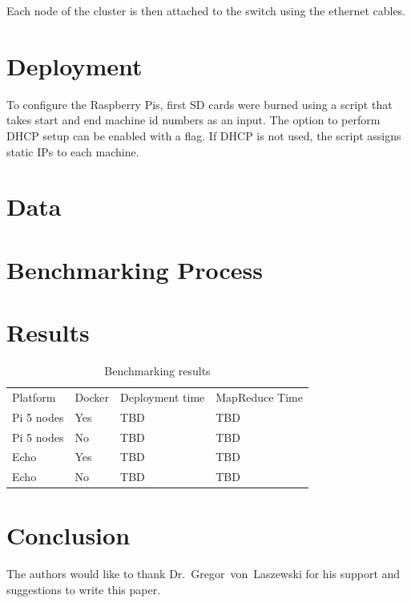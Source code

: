 Each node of the cluster is then attached to the switch using the ethernet cables. 

\section{Deployment}
To configure the Raspberry Pis, first SD cards were burned using a
script that takes start and end machine id numbers as an input. The
option to perform DHCP setup can be enabled with a flag. If DHCP is
not used, the script assigns static IPs to each machine.

\section{Data}


\section{Benchmarking Process}


\section{Results}

\begin{table}[hbt]
\centering
\caption{Benchmarking results}\label{t:results-table}
\begin{tabular}{llll}
Platform    & Docker & Deployment time & MapReduce Time \\
Pi 5 nodes  & Yes    & TBD             & TBD            \\
Pi 5 nodes  & No     & TBD             & TBD            \\
Echo        & Yes    & TBD             & TBD            \\
Echo        & No     & TBD             & TBD            \\
\end{tabular}
\end{table}



\section{Conclusion}



\begin{acks}

  The authors would like to thank Dr.~Gregor~von~Laszewski for his
  support and suggestions to write this paper.

\end{acks}



